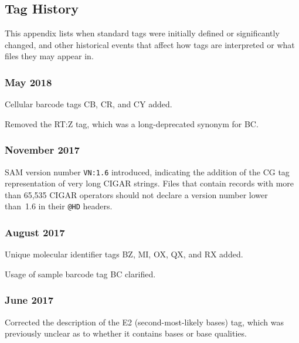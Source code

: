\documentclass[10pt]{article}
\begin{document}
\begin{appendices}
\appendix
\section{Tag History}

This appendix lists when standard tags were initially defined or significantly changed, and other historical events that affect how tags are interpreted or what files they may appear in.

\setlength{\parindent}{0pt}
\newcommand*{\gap}{\vspace*{2ex}}

\subsubsection*{May 2018}

Cellular barcode tags CB, CR, and CY added.

Removed the RT:Z tag, which was a long-deprecated synonym for BC.

\subsubsection*{November 2017}

SAM version number {\tt VN:1.6} introduced, indicating the addition of the CG tag representation of very long CIGAR strings.
Files that contain records with more than 65,535 CIGAR operators should not declare a version number lower than~1.6 in their {\tt @HD} headers.

\subsubsection*{August 2017}

Unique molecular identifier tags BZ, MI, OX, QX, and RX added.

Usage of sample barcode tag BC clarified.

\subsubsection*{June 2017}

Corrected the description of the E2 (second-most-likely bases) tag, which was previously unclear as to whether it contains bases or base qualities.


\end{appendices}
\end{document}
